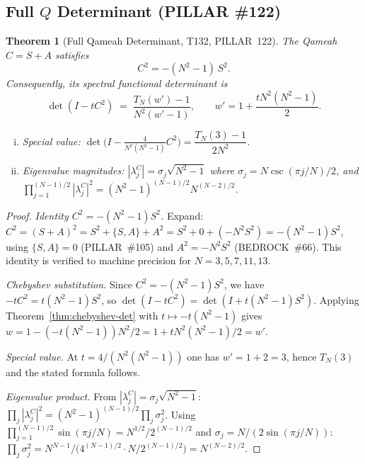 \documentclass[aps,prd,twocolumn,superscriptaddress,floatfix,nofootinbib]{revtex4-2}
\newtheorem{theorem}{Theorem}
\theoremstyle{definition}
\theoremstyle{remark}
\begin{document}
\subsection{Full $Q$ Determinant (PILLAR \#122)}
\label{sec:q-det}

\begin{theorem}[Full Qameah Determinant, T132, PILLAR~122]
\label{thm:q-det}
  The Qameah $C = S+A$ satisfies
  \[
    C^2 = -(N^2-1)\,S^2.
  \]
  Consequently, its spectral functional determinant is
  \[
    \det(I - t C^2)
      \;=\;
      \frac{T_N(w') - 1}{N^2(w'-1)},
    \qquad
    w' = 1 + \frac{t N^2(N^2-1)}{2}.
  \]
  \begin{enumerate}[(i)]
    \item \emph{Special value:}
      $\det\!\bigl(I - \tfrac{4}{N^2(N^2-1)} C^2\bigr)
        = \dfrac{T_N(3)-1}{2N^2}$.
    \item \emph{Eigenvalue magnitudes:}
      $|\lambda_j^C| = \sigma_j\sqrt{N^2-1}$ where $\sigma_j = N\csc(\pi j/N)/2$,
      and $\prod_{j=1}^{(N-1)/2}|\lambda_j^C|^2 = (N^2-1)^{(N-1)/2} N^{(N-2)/2}$.
  \end{enumerate}
\end{theorem}

\begin{proof}
  \emph{Identity $C^2 = -(N^2-1)S^2$.}
  Expand: $C^2 = (S+A)^2 = S^2 + \{S,A\} + A^2 = S^2 + 0 + (-N^2 S^2) = -(N^2-1)S^2$,
  using $\{S,A\}=0$ (PILLAR~\#105) and $A^2=-N^2 S^2$ (BEDROCK~\#66).
  This identity is verified to machine precision for $N=3,5,7,11,13$.

  \emph{Chebyshev substitution.}
  Since $C^2 = -(N^2-1)S^2$, we have $-tC^2 = t(N^2-1)S^2$, so
  $\det(I-tC^2) = \det(I + t(N^2-1)S^2)$.
  Applying Theorem~\ref{thm:chebyshev-det} with $t \mapsto -t(N^2-1)$ gives
  $w = 1 - (-t(N^2-1))N^2/2 = 1 + tN^2(N^2-1)/2 = w'$.

  \emph{Special value.}
  At $t = 4/(N^2(N^2-1))$ one has $w' = 1 + 2 = 3$, hence $T_N(3)$ and
  the stated formula follows.

  \emph{Eigenvalue product.}
  From $|\lambda_j^C| = \sigma_j\sqrt{N^2-1}$:
  $\prod_j |\lambda_j^C|^2 = (N^2-1)^{(N-1)/2}\prod_j \sigma_j^2$.
  Using $\prod_{j=1}^{(N-1)/2}\sin(\pi j/N) = N^{1/2}/2^{(N-1)/2}$ and
  $\sigma_j = N/(2\sin(\pi j/N))$:
  $\prod_j\sigma_j^2 = N^{N-1}/\bigl(4^{(N-1)/2}\cdot N/2^{(N-1)/2}\bigr) = N^{(N-2)/2}$.
\end{proof}
\end{document}
